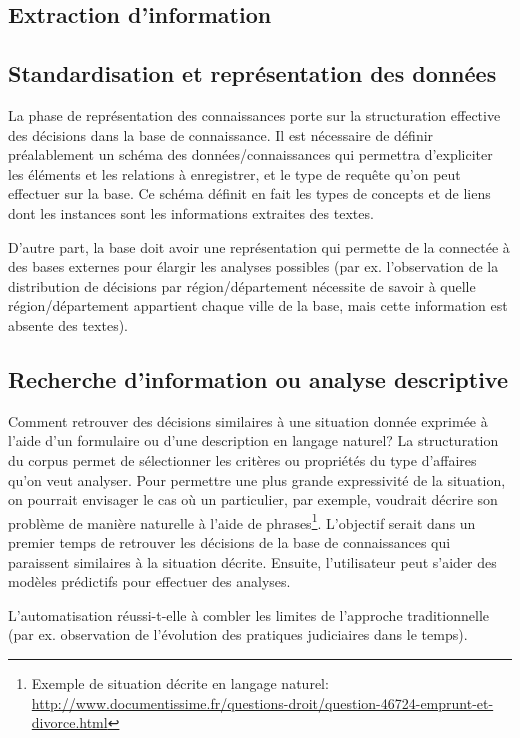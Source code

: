 \subsection{Extraction d'information}

\subsection{Standardisation et représentation des données}
La phase de représentation des connaissances porte sur la structuration effective des décisions dans la base de connaissance. Il est nécessaire de définir préalablement un schéma des données/connaissances qui permettra d'expliciter les éléments et les relations à enregistrer, et le type de requête qu'on peut effectuer sur la base. Ce schéma définit en fait les types de concepts et de liens dont les instances sont les informations extraites des textes.

D'autre part, la base doit avoir une représentation qui permette de la connectée à des bases externes pour élargir les analyses possibles (par ex. l'observation de la distribution de décisions par région/département nécessite de savoir à quelle région/département appartient chaque ville de la base, mais cette information est absente des textes).

\subsection{Recherche d'information ou analyse descriptive}
Comment retrouver des décisions similaires à une situation donnée exprimée à l'aide d'un formulaire ou d'une description en langage naturel? La structuration du corpus permet de sélectionner les critères ou propriétés du type d'affaires qu'on veut analyser. Pour permettre une plus grande expressivité de la situation, on pourrait envisager le cas où un particulier, par exemple, voudrait décrire son problème de manière naturelle à l'aide de phrases\footnote{Exemple de situation décrite en langage naturel: \url{http://www.documentissime.fr/questions-droit/question-46724-emprunt-et-divorce.html}}. L'objectif serait dans un premier temps de retrouver les décisions de la base de connaissances qui paraissent similaires à la situation décrite. Ensuite, l'utilisateur  peut s'aider des modèles prédictifs pour effectuer des analyses.

L'automatisation réussi-t-elle à combler les limites de l'approche traditionnelle (par ex. observation de l'évolution des pratiques judiciaires dans le temps).

